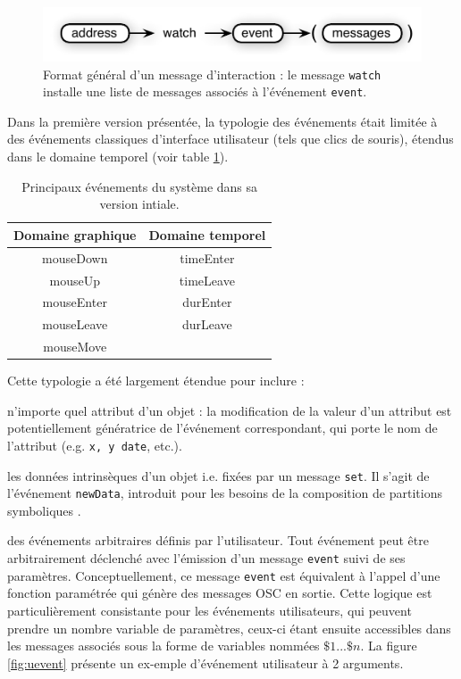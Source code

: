 \documentclass{article}
\newcommand{\OSC}[1]	{{\fontsize{9pt}{9pt} \selectfont\texttt{#1}}}
\let\olditemize\itemize
\let\oldenditemize\enditemize
\renewenvironment{itemize} 	{\olditemize \renewcommand{\labelitemi}{$\bullet$} \setlength{\itemsep}{0mm}}{\oldenditemize}
\begin{document}
\begin{figure}[htbp]
\centerline{
	\includegraphics[width=0.95\columnwidth]{imgs/watch}}
\caption{Format général d'un message d'interaction : le message \OSC{watch} installe une liste de messages associés à l'événement \OSC{event}.}
\label{fig:watch}
\end{figure}


Dans la première version présentée, la typologie des événements était limitée à des événements classiques d'interface utilisateur (tels que clics de souris), étendus dans le domaine temporel (voir table \ref{tbl:evts}). 

\begin{table}[htp]
\begin{center}
\begin{tabular}{c|c}
Domaine graphique & Domaine temporel \\
\hline
mouseDown 		& timeEnter	\\
mouseUp			& timeLeave	\\
mouseEnter		& durEnter		\\
mouseLeave		& durLeave		\\
mouseMove		&				\\
\end{tabular}
\end{center}
\caption{Principaux événements du système dans sa version intiale.}
\label{tbl:evts}
\end{table}%

Cette typologie a été largement étendue pour inclure :
\begin{itemize}
\item n'importe quel attribut d'un objet : la modification de la valeur d'un attribut est potentiellement génératrice de l'événement correspondant, qui porte le nom de l'attribut (e.g. \OSC{x, y date}, etc.). 
\item les données intrinsèques d'un objet i.e. fixées par un message \OSC{set}. Il s'agit de l'événement \OSC{newData}, introduit pour les besoins de la composition de partitions symboliques \cite{lepetit16}.
\item des événements arbitraires définis par l'utilisateur.
\end{itemize}
\vspace*{1mm}
Tout événement peut être arbitrairement déclenché avec l'émission d'un message \OSC{event} suivi de ses paramètres. Conceptuellement, ce message \OSC{event} est équivalent à l'appel d'une fonction paramétrée qui génère des messages OSC en sortie. 
Cette logique est particulièrement consistante pour les événements utilisateurs, qui peuvent prendre un nombre variable de paramètres, ceux-ci étant ensuite accessibles dans les messages associés sous la forme de variables nommées $\$1...\$n$. La figure \ref{fig:uevent} présente un ex-emple d'événement utilisateur à 2 arguments.
\end{document}

